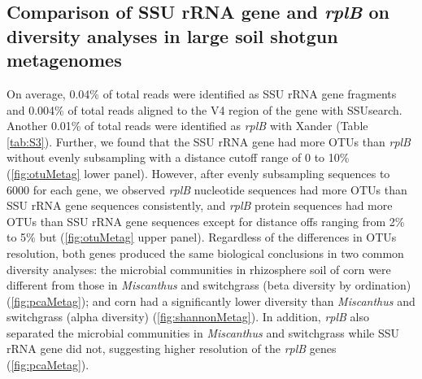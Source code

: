 \documentclass[]{msu-thesis}
\begin{document}
\subsection{Comparison of SSU rRNA gene and \textit{rplB} on diversity analyses in large soil shotgun metagenomes}
On average, 0.04\% of total reads were identified as SSU rRNA gene fragments and 0.004\% of total reads aligned to the V4 region of the gene with SSUsearch. Another 0.01\% of total reads were identified as \textit{rplB} with Xander (Table \ref{tab:S3}). Further, we found that the SSU rRNA gene had more OTUs than \textit{rplB} without evenly subsampling with a distance cutoff range of 0 to 10\% (\cref{fig:otuMetag} lower panel). However, after evenly subsampling sequences to 6000 for each gene, we observed \textit{rplB} nucleotide sequences had more OTUs than SSU rRNA gene sequences consistently, and \textit{rplB} protein sequences had more OTUs than SSU rRNA gene sequences except for distance offs ranging from 2\% to 5\% but (\cref{fig:otuMetag} upper panel). Regardless of the differences in OTUs resolution, both genes produced the same biological conclusions in two common diversity analyses: the microbial communities in rhizosphere soil of corn were different from those in \textit{Miscanthus} and switchgrass (beta diversity by ordination) (\cref{fig:pcaMetag}); and corn had a significantly lower diversity than \textit{Miscanthus} and switchgrass (alpha diversity) (\cref{fig:shannonMetag}). In addition, \textit{rplB} also separated the microbial communities in \textit{Miscanthus} and switchgrass while SSU rRNA gene did not, suggesting higher resolution of the \textit{rplB} genes (\cref{fig:pcaMetag}).
\end{document}
